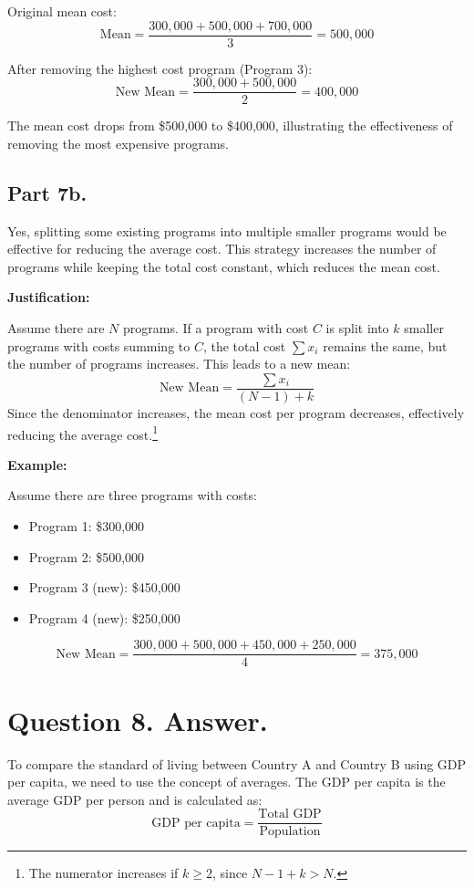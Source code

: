 \documentclass{article}
\begin{document}
Original mean cost:
\[
\text{Mean} = \frac{300,000 + 500,000 + 700,000}{3} = 500,000
\]

After removing the highest cost program (Program 3):
\[
\text{New Mean} = \frac{300,000 + 500,000}{2} = 400,000
\]

The mean cost drops from \$500,000 to \$400,000, illustrating the effectiveness of removing the most expensive programs.

\subsection*{Part 7b.}

Yes, splitting some existing programs into multiple smaller programs would be effective for reducing the average cost. This strategy increases the number of programs while keeping the total cost constant, which reduces the mean cost.

\textbf{Justification:}

Assume there are $N$ programs. If a program with cost \(C\) is split into \(k\) smaller programs with costs summing to \(C\), the total cost \(\sum x_i\) remains the same, but the number of programs increases. This leads to a new mean:
\[
\text{New Mean} = \frac{\sum x_i}{ (N-1) + k}
\]
Since the denominator increases, the mean cost per program decreases, effectively reducing the average cost.\footnote{The numerator increases if $k\geq 2$, since $N-1+k > N$.}

\textbf{Example:}

Assume there are three programs with costs:
\begin{itemize}
    \item Program 1: \$300,000
    \item Program 2: \$500,000
    \item Program 3 (new): \$450,000
    \item Program 4 (new): \$250,000
\end{itemize}

\[
\text{New Mean} = \frac{300,000 + 500,000 + 450,000 + 250,000}{4} = 375,000
\]

\section*{Question 8. Answer.}

To compare the standard of living between Country A and Country B using GDP per capita, we need to use the concept of averages. The GDP per capita is the average GDP per person and is calculated as:
\[
\text{GDP per capita} = \frac{\text{Total GDP}}{\text{Population}}
\]
\end{document}
